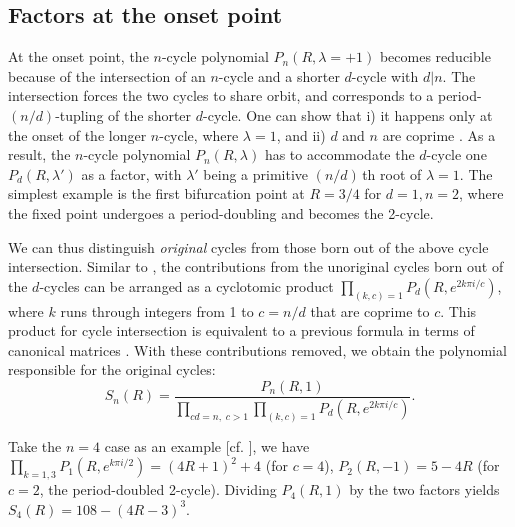 \documentclass{ws-ijbc}
\begin{document}
\subsection{\label{sec:origfac}%
  Factors at the onset point}


At the onset point,
  the $n$-cycle polynomial
  $P_n(R, \lambda = +1)$
  becomes reducible
%
  because of the intersection of an $n$-cycle
  and a shorter $d$-cycle with $d|n$.
%
The intersection forces the two cycles to share orbit,
 and corresponds to
  a period-$(n/d)$-tupling \cite{hao}
  of the shorter $d$-cycle.
%
One can show that i) it happens only
  at the onset of the longer $n$-cycle, where $\lambda = 1$,
%
  and ii) $d$ and $n$ are coprime \cite{blackhurst}.
%
As a result, the $n$-cycle polynomial $P_n(R, \lambda)$
  has to accommodate the $d$-cycle one $P_d(R, \lambda')$ as a factor,
  with $\lambda'$ being a primitive $(n/d)\,$th root of $\lambda = 1$.
%
The simplest example is the first bifurcation point
  at $R = 3/4$ for $d = 1, n = 2$,
  where the fixed point %
  undergoes a period-doubling and becomes the 2-cycle. %


We can thus distinguish \emph{original} cycles
  from those born out of the above cycle intersection. %
%
Similar to ,
  the contributions from the unoriginal cycles
  born out of the $d$-cycles
  can be arranged as a cyclotomic product
  $\prod_{(k, c) = 1}
      P_{d}
        \left(
          R, e^{2k\pi i/c}
        \right)$,
where $k$ runs through integers from 1 to $c=n/d$
  that are coprime to $c$.
%
This product for cycle intersection is equivalent to a previous
  formula in terms of canonical matrices \cite{blackhurst}.
%
With these contributions removed,
  we obtain the polynomial responsible for the original cycles:
  \begin{equation}
    S_n(R)
    = \frac
    {
      P_n(R, 1)
    }
    {
      \prod_{c d =  n, \; c > 1}
        \prod_{(k, c) = 1}
      P_{d}
        \left(
          R, e^{2k\pi i/c}
        \right)
    }.
  \label{eq:origfac}
  \end{equation}


%
%
%
Take the $n = 4$ case as an example
[cf. ],
we have
$\prod_{k=1,3} P_1(R, e^{k\pi i/2})
=(4R+1)^2+4$
(for $c = 4$),
$P_2(R, -1) = 5 - 4R$
(for $c = 2$, the period-doubled 2-cycle).
%
Dividing $P_4(R, 1)$
by the two factors yields
$S_4(R) = 108-(4R-3)^3$.
\end{document}
